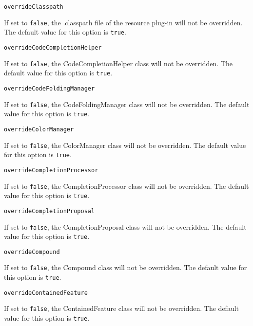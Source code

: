 \noindent\texttt{overrideClasspath}
\begin{myindentpar}{1cm}
If set to \texttt{false}, the .classpath file of the resource plug-in will not be overridden. The default value for this option is \texttt{true}.
\end{myindentpar}

\noindent\texttt{overrideCodeCompletionHelper}
\begin{myindentpar}{1cm}
If set to \texttt{false}, the CodeCompletionHelper class will not be overridden. The default value for this option is \texttt{true}.
\end{myindentpar}

\noindent\texttt{overrideCodeFoldingManager}
\begin{myindentpar}{1cm}
If set to \texttt{false}, the CodeFoldingManager class will not be overridden. The default value for this option is \texttt{true}.
\end{myindentpar}

\noindent\texttt{overrideColorManager}
\begin{myindentpar}{1cm}
If set to \texttt{false}, the ColorManager class will not be overridden. The default value for this option is \texttt{true}.
\end{myindentpar}

\noindent\texttt{overrideCompletionProcessor}
\begin{myindentpar}{1cm}
If set to \texttt{false}, the CompletionProcessor class will not be overridden. The default value for this option is \texttt{true}.
\end{myindentpar}

\noindent\texttt{overrideCompletionProposal}
\begin{myindentpar}{1cm}
If set to \texttt{false}, the CompletionProposal class will not be overridden. The default value for this option is \texttt{true}.
\end{myindentpar}

\noindent\texttt{overrideCompound}
\begin{myindentpar}{1cm}
If set to \texttt{false}, the Compound class will not be overridden. The default value for this option is \texttt{true}.
\end{myindentpar}

\noindent\texttt{overrideContainedFeature}
\begin{myindentpar}{1cm}
If set to \texttt{false}, the ContainedFeature class will not be overridden. The default value for this option is \texttt{true}.
\end{myindentpar}

